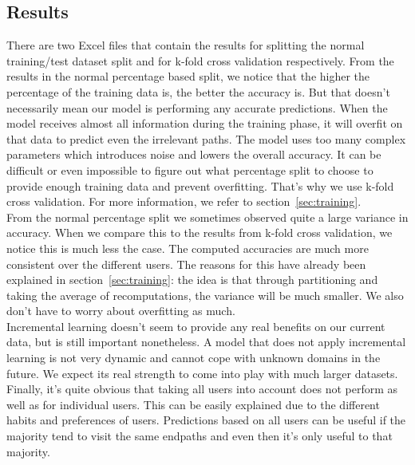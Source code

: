 \subsection{Results}\label{subsec:results}

There are two Excel files that contain the results for splitting the normal training/test dataset split and for k-fold cross validation respectively. From the results in the normal percentage based split, we notice that the higher the percentage of the training data is, the better the accuracy is. But that doesn't necessarily mean our model is performing any accurate predictions. When the model receives almost all information during the training phase, it will overfit on that data to predict even the irrelevant paths. The model uses too many complex parameters which introduces noise and lowers the overall accuracy. It can be difficult or even impossible to figure out what percentage split to choose to provide enough training data and prevent overfitting. That's why we use k-fold cross validation. For more information, we refer to section~\ref{sec:training}.
\\[2ex]
From the normal percentage split we sometimes observed quite a large variance in accuracy. When we compare this to the results from k-fold cross validation, we notice this is much less the case. The computed accuracies are much more consistent over the different users. The reasons for this have already been explained in section~\ref{sec:training}: the idea is that through partitioning and taking the average of recomputations, the variance will be much smaller. We also don't have to worry about overfitting as much.
\\[2ex]
Incremental learning doesn't seem to provide any real benefits on our current data, but is still important nonetheless. A model that does not apply incremental learning is not very dynamic and cannot cope with unknown domains in the future. We expect its real strength to come into play with much larger datasets.
\\[2ex]
Finally, it's quite obvious that taking all users into account does not perform as well as for individual users. This can be easily explained due to the different habits and preferences of users. Predictions based on all users can be useful if the majority tend to visit the same endpaths and even then it's only useful to that majority.
